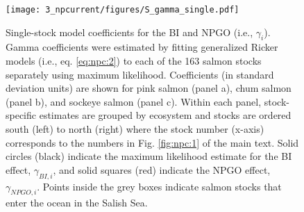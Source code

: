 \begin{figure}[htbp]
  \centering \texttt{[image: 3\_npcurrent/figures/S\_gamma\_single.pdf]}
  \caption[Single-stock model coefficients for the BI and NPGO]{Single-stock
           model coefficients for the BI and NPGO (i.e., $\gamma_i$). Gamma
           coefficients were estimated by fitting generalized Ricker models
           (i.e., eq. \ref{eq:npc:2}) to each of the 163 salmon stocks
           separately using maximum likelihood. Coefficients (in standard
           deviation units) are shown for pink salmon (panel a), chum salmon
           (panel b), and sockeye salmon (panel c). Within each panel,
           stock-specific estimates are grouped by ecosystem and stocks are
           ordered south (left) to north (right) where the stock number (x-axis)
           corresponds to the numbers in Fig. \ref{fig:npc:1} of the main text.
           Solid circles (black) indicate the maximum likelihood estimate for
           the BI effect, $\gamma_{BI,i}$, and solid squares (red) indicate the
           NPGO effect, $\gamma_{NPGO,i}$. Points inside the grey boxes indicate
           salmon stocks that enter the ocean in the Salish Sea.}
  \label{fig:npc:s3}
\end{figure}
